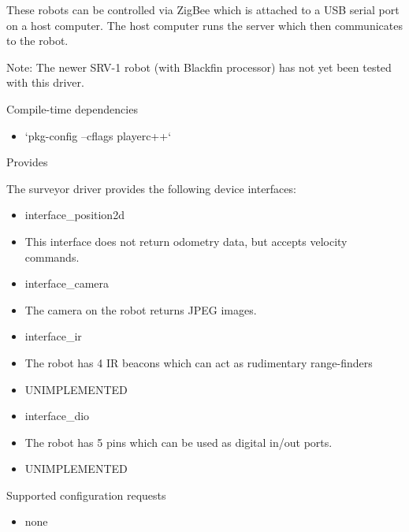 These robots can be controlled via ZigBee which is attached to a USB serial port on a host computer. The host computer runs the server which then communicates to the robot.

\begin{Desc}
\item[Note:]The newer SRV-1 robot (with Blackfin processor) has not yet been tested with this driver.\end{Desc}
\begin{Desc}
\item[Compile-time dependencies]\end{Desc}
\begin{itemize}
\item `pkg-config --cflags playerc++`\end{itemize}


\begin{Desc}
\item[Provides]\end{Desc}
The surveyor driver provides the following device interfaces:

\begin{itemize}
\item interface\_\-position2d\item This interface does not return odometry data, but accepts velocity commands.\end{itemize}


\begin{itemize}
\item interface\_\-camera\item The camera on the robot returns JPEG images.\end{itemize}


\begin{itemize}
\item interface\_\-ir\item The robot has 4 IR beacons which can act as rudimentary range-finders\item UNIMPLEMENTED\end{itemize}


\begin{itemize}
\item interface\_\-dio\item The robot has 5 pins which can be used as digital in/out ports.\item UNIMPLEMENTED\end{itemize}


\begin{Desc}
\item[Supported configuration requests]\end{Desc}
\begin{itemize}
\item none\end{itemize}


